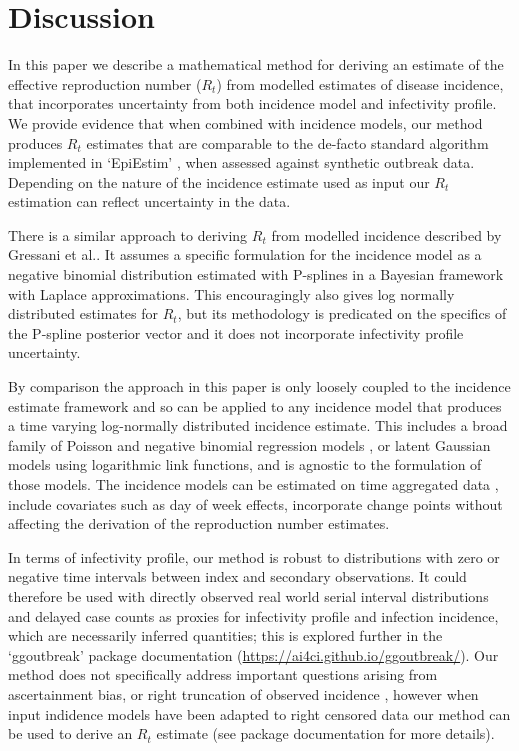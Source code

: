 \documentclass[10pt,letterpaper]{article}
\begin{document}
\section*{Discussion}

In this paper we describe a mathematical method for deriving an estimate of the effective reproduction number ($R_t$) from modelled estimates of disease incidence, that incorporates uncertainty from both incidence model and infectivity profile. We provide evidence that when combined with incidence models, our method produces $R_t$ estimates that are comparable to the de-facto standard algorithm implemented in `EpiEstim' \cite{thompson2019}, when assessed against synthetic outbreak data. Depending on the nature of the incidence estimate used as input our $R_t$ estimation can reflect uncertainty in the data.

There is a similar approach to deriving $R_t$ from modelled incidence described by Gressani et al.\cite{gressani2022}. It assumes a specific formulation for the incidence model as a negative binomial distribution estimated with P-splines in a Bayesian framework with Laplace approximations. This encouragingly also gives log normally distributed estimates for $R_t$, but its methodology is predicated on the specifics of the P-spline posterior vector and it does not incorporate infectivity profile uncertainty.

By comparison the approach in this paper is only loosely coupled to the incidence estimate framework and so can be applied to any incidence model that produces a time varying log-normally distributed incidence estimate. This includes a broad family of Poisson and negative binomial regression models \cite{nelder1972,loader1999,hastie2017}, or latent Gaussian models \cite{rue2009} using logarithmic link functions, and is agnostic to the formulation of those models. The incidence models can be estimated on time aggregated data \cite{nash2023}, include covariates such as day of week effects, incorporate change points without affecting the derivation of the reproduction number estimates.

In terms of infectivity profile, our method is robust to distributions with zero or negative time intervals between index and secondary observations. It could therefore be used with directly observed real world serial interval distributions \cite{park2021} and delayed case counts as proxies for infectivity profile and infection incidence, which are necessarily inferred quantities; this is explored further in the `ggoutbreak' package documentation (\url{https://ai4ci.github.io/ggoutbreak/}). Our method does not specifically address important questions arising from ascertainment bias, or right truncation of observed incidence  \cite{abbott2020,abbott2024}, however when input indidence models have been adapted to right censored data our method can be used to derive an $R_t$ estimate (see package documentation for more details).
\end{document}

